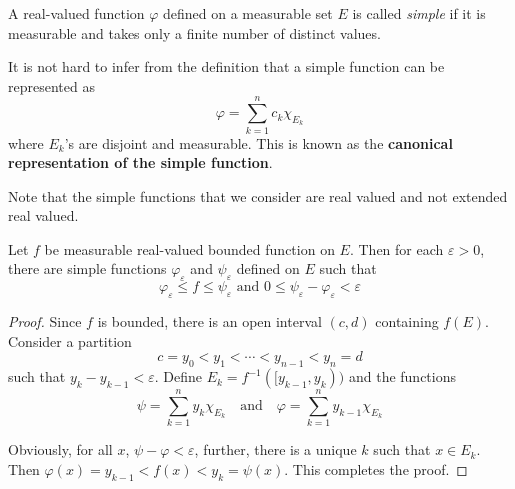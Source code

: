 \begin{definition}
    A real-valued function $\varphi$ defined on a measurable set $E$ is called \textit{simple} if it is measurable and takes only a finite number of distinct values.
\end{definition}

It is not hard to infer from the definition that a simple function can be represented as 
\begin{equation*}
    \varphi = \sum_{k = 1}^n c_k\chi_{E_k}
\end{equation*}
where $E_k$'s are disjoint and measurable. This is known as the \textbf{canonical representation of the simple function}.

Note that the simple functions that we consider are real valued and not extended real valued.

\begin{lemma}
    Let $f$ be measurable real-valued bounded function on $E$. Then for each $\varepsilon > 0$, there are simple functions $\varphi_\varepsilon$ and $\psi_\varepsilon$ defined on $E$ such that 
    \begin{equation*}
        \varphi_\varepsilon\le f\le\psi_\varepsilon\text{ and } 0\le\psi_\varepsilon - \varphi_\varepsilon < \varepsilon
    \end{equation*}
\end{lemma}
\begin{proof}
    Since $f$ is bounded, there is an open interval $(c,d)$ containing $f(E)$. Consider a partition 
    \begin{equation*}
        c = y_0 < y_1 < \cdots < y_{n - 1} < y_n = d
    \end{equation*}
    such that $y_k - y_{k - 1} < \varepsilon$. Define $E_k = f^{-1}([y_{k - 1}, y_k))$ and the functions 
    \begin{equation*}
        \psi = \sum_{k = 1}^n y_k\chi_{E_k}\quad\text{and}\quad\varphi = \sum_{k = 1}^{n}y_{k - 1}\chi_{E_k}
    \end{equation*}

    Obviously, for all $x$, $\psi - \varphi < \varepsilon$, further, there is a unique $k$ such that $x\in E_k$. Then $\varphi(x) = y_{k - 1} < f(x) < y_k = \psi(x)$. This completes the proof.
\end{proof}

